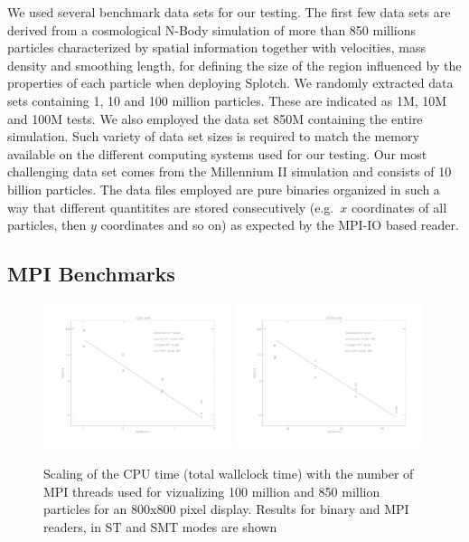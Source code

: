 \documentclass[1p,times]{elsarticle}
\begin{document}
We used several benchmark data sets for our testing. The first
few data sets are derived from a cosmological N-Body simulation of more than 850 millions
particles characterized by spatial information together with velocities, mass density 
and smoothing length, for defining the size of the region influenced by the properties 
of each particle when deploying Splotch. We randomly extracted data sets containing
1, 10 and 100 million particles. These are indicated as 1M, 
10M and 100M tests. We also employed the data set 850M containing the entire simulation.
Such variety of data set sizes is required to match the memory available on
the different computing systems used for our testing.
Our most challenging data set comes from the Millennium II simulation \cite{2009MNRAS.398.1150B}
and consists of 10 billion particles. The data files employed are pure binaries organized in such a way that different
quantitites are stored consecutively (e.g.\ $x$ coordinates of all particles, then $y$ coordinates and so on) as expected by the MPI-IO based reader. 

\subsection{MPI Benchmarks}

\begin{figure}
\begin{center}
\includegraphics[width=0.49\textwidth]{bench100M_r.pdf}
\includegraphics[width=0.49\textwidth]{bench870M_r.pdf}
\end{center}
\caption{Scaling of the CPU time (total wallclock time) with the number of MPI threads 
used for vizualizing 100 million
and 850 million particles for an 800x800 pixel display.
Results for binary and MPI readers, in ST and SMT modes are shown}\label{mpi100M}
\end{figure}
\end{document}
